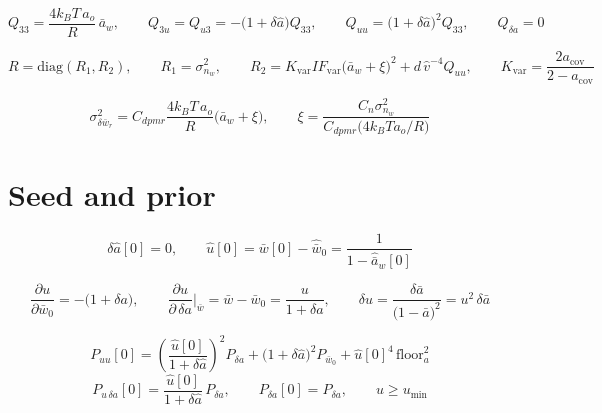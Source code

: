 \documentclass[11pt,a4paper,fontset=none]{ctexart}
\newcommand{\ba}{\bar{a}}
\newcommand{\bw}{\bar{w}}
\begin{document}
\begin{equation*}
Q_{33} = \frac{4k_BT\,a_o}{R}\,\ba_w,
\qquad
Q_{3u} = Q_{u3} = -\bigl(1+\delta\hat{a}\bigr)Q_{33},
\qquad
Q_{uu} = \bigl(1+\delta\hat{a}\bigr)^{2}Q_{33},
\qquad
Q_{\delta a} = 0
\end{equation*}

\begin{equation*}
R = \mathrm{diag}(R_1, R_2),
\qquad
R_1 = \sigma^{2}_{n_w},
\qquad
R_2 = K_{\mathrm{var}} IF_{\mathrm{var}}\bigl(\ba_w+\xi\bigr)^{2}
  + d\,\hat{v}^{-4}Q_{uu},
\qquad
K_{\mathrm{var}} = \frac{2a_{\mathrm{cov}}}{2-a_{\mathrm{cov}}}
\end{equation*}

\begin{equation*}
\sigma^{2}_{\delta\bw_r} = C_{dpmr}\frac{4k_BT\,a_o}{R}\bigl(\ba_w+\xi\bigr),
\qquad
\xi = \frac{C_n\sigma^{2}_{n_w}}{C_{dpmr}\bigl(4k_BT a_o/R\bigr)}
\end{equation*}

\section*{Seed and prior}

\begin{equation*}
\delta\hat{a}[0] = 0,
\qquad
\hat{u}[0] = \bw[0] - \hat{\bw}_0 = \frac{1}{1-\hat{\ba}_w[0]}
\end{equation*}

\begin{equation*}
\frac{\partial u}{\partial\bw_0} = -\bigl(1+\delta a\bigr),
\qquad
\frac{\partial u}{\partial\,\delta a}\bigg|_{\bw} = \bw - \bw_0 = \frac{u}{1+\delta a},
\qquad
\delta u = \frac{\delta\ba}{\bigl(1-\ba\bigr)^{2}} = u^{2}\,\delta\ba
\end{equation*}

\begin{equation*}
P_{uu}[0] = \left(\frac{\hat{u}[0]}{1+\delta\hat{a}}\right)^{2}P_{\delta a}
  + \bigl(1+\delta\hat{a}\bigr)^{2}P_{\bw_0}
  + \hat{u}[0]^{4}\,\mathrm{floor}_a^{2}
\end{equation*}
\begin{equation*}
P_{u\,\delta a}[0] = \frac{\hat{u}[0]}{1+\delta\hat{a}}\,P_{\delta a},
\qquad
P_{\delta a}[0] = P_{\delta a},
\qquad
u \geq u_{\min}
\end{equation*}
\end{document}
